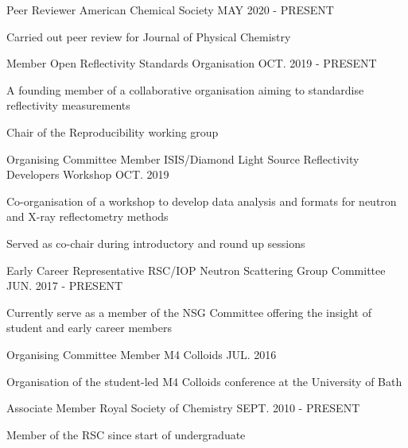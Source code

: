 \begin{cventries}
  \cventry
    {Peer Reviewer}
    {American Chemical Society}
    {}
    {MAY 2020 - PRESENT}
    {
        \begin{cvitems}
            \item{Carried out peer review for Journal of Physical Chemistry}
        \end{cvitems}
    }
  \cventry
    {Member}
    {Open Reflectivity Standards Organisation}
    {}
    {OCT. 2019 - PRESENT}
    {
      \begin {cvitems}
        \item {A founding member of a collaborative organisation aiming to standardise reflectivity measurements}
        \item {Chair of the Reproducibility working group}
      \end {cvitems}
    }
  \cventry
    {Organising Committee Member}
    {ISIS/Diamond Light Source Reflectivity Developers Workshop}
    {}
    {OCT. 2019}
    {
      \begin{cvitems}
        \item{Co-organisation of a workshop to develop data analysis and formats for neutron and X-ray reflectometry methods}
        \item{Served as co-chair during introductory and round up sessions}
      \end{cvitems}
    }
  \cventry
  	{Early Career Representative}
    {RSC/IOP Neutron Scattering Group Committee}
    {}
    {JUN. 2017 - PRESENT}
    {
      \begin{cvitems}
      	\item{Currently serve as a member of the NSG Committee offering the insight of student and early career members}
	  \end{cvitems}
	}
  \cventry
    {Organising Committee Member}
    {M4 Colloids}
    {}
    {JUL. 2016}
    {
      \begin{cvitems}
        \item{Organisation of the student-led M4 Colloids conference at the University of Bath}
      \end{cvitems}
    }
  \cventry
    {Associate Member}
    {Royal Society of Chemistry}
    {}
    {SEPT. 2010 - PRESENT}
    {
      \begin{cvitems}
      	\item{Member of the RSC since start of undergraduate}
      \end{cvitems}
    }
\end{cventries}
